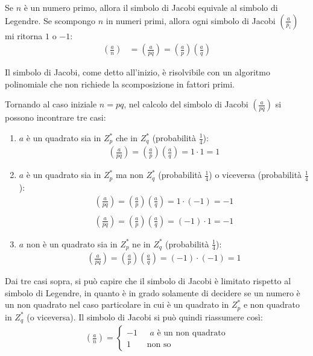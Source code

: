 \noindent Se $n$ è un numero primo, allora il simbolo di Jacobi equivale al simbolo di Legendre. Se scompongo $n$ in numeri primi, allora ogni simbolo di Jacobi $\left(\frac{a}{p_i}\right)$ mi ritorna $1$ o $-1$:
\begin{align*}
    \left(\frac{a}{n}\right) &= \left(\frac{a}{pq}\right) = \left(\frac{a}{p}\right)\left(\frac{a}{q}\right)
\end{align*}

\noindent Il simbolo di Jacobi, come detto all'inizio, è risolvibile con un algoritmo polinomiale che non richiede la scomposizione in fattori primi.

Tornando al caso iniziale $n = pq$, nel calcolo del simbolo di Jacobi $\left(\frac{a}{pq}\right)$ si possono incontrare tre casi:
\begin{enumerate}
    \item $a$ è un quadrato sia in $Z_p^*$ che in $Z_q^*$ (probabilità $\frac{1}{4}$):
        \begin{align*}
            \left(\frac{a}{pq}\right) = \left(\frac{a}{p}\right)\left(\frac{a}{q}\right) = 1 \cdot 1 = 1
        \end{align*}
    \item $a$ è un quadrato sia in $Z_p^*$ ma non $Z_q^*$ (probabilità $\frac{1}{4}$) o viceversa (probabilità $\frac{1}{4}$):
        \begin{align*}
            \left(\frac{a}{pq}\right) = \left(\frac{a}{p}\right)\left(\frac{a}{q}\right) = 1 \cdot (-1) = -1\\\\
            \left(\frac{a}{pq}\right) = \left(\frac{a}{p}\right)\left(\frac{a}{q}\right) = (-1) \cdot 1 = -1
        \end{align*}
    \item $a$ non è un quadrato sia in $Z_p^*$ ne in $Z_q^*$ (probabilità $\frac{1}{4}$):
        \begin{align*}
            \left(\frac{a}{pq}\right) = \left(\frac{a}{p}\right)\left(\frac{a}{q}\right) = (-1) \cdot (-1) = 1
        \end{align*}
\end{enumerate}

\noindent Dai tre casi sopra, si può capire che il simbolo di Jacobi è limitato rispetto al simbolo di Legendre, in quanto è in grado solamente di decidere se un numero è un non quadrato nel caso particolare in cui è un quadrato in $Z_p^*$ e non quadrato in $Z_q^*$ (o viceversa).
Il simbolo di Jacobi si può quindi riassumere così:
\begin{align*}
    \left(\frac{a}{n}\right)=
 	    \begin{cases}
 	   -1& \mbox{ $a$ è un non quadrato}\\ 
 	    1& \mbox{ non so}
        \end{cases} 
\end{align*}

